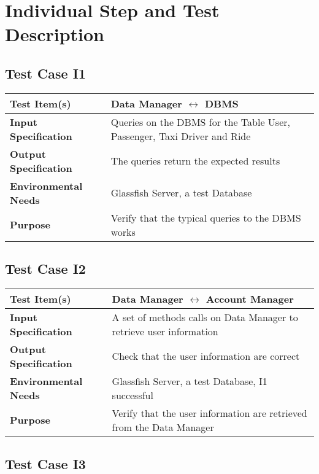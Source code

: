 \section{Individual Step and Test Description}
  
   \subsection{Test Case I1}
   
   	\begin{tabular}{p{} p{}}
   		\hline
   		\textbf{Test Item(s)} & Data Manager $ \longleftrightarrow $ DBMS  \\
   		\hline
   		\textbf{Input Specification} & Queries on the DBMS for the Table User, Passenger, Taxi Driver and Ride\\
   		\hline
   		\textbf{Output Specification} & The queries return the expected results\\
   		\hline
   		\textbf{Environmental Needs} &  Glassfish Server, a test Database\\
   		\hline
   		\textbf{Purpose} & Verify that the typical queries to the DBMS works \\
   		\hline
   	\end{tabular}
   
   
    \subsection{Test Case I2}
    
    	\begin{tabular}{p{} p{}}
    		\hline
    		\textbf{Test Item(s)} & Data Manager $ \longleftrightarrow $ Account Manager   \\
    		\hline
    		\textbf{Input Specification} & A set of methods calls on Data Manager to retrieve user information \\
    		\hline
    		\textbf{Output Specification} & Check that the user information are correct \\
    		\hline
    		\textbf{Environmental Needs} &  Glassfish Server, a test Database, I1 successful\\
    		\hline
    		\textbf{Purpose} & Verify that the user information are retrieved from the Data Manager \\
    		\hline
    	\end{tabular}
    
    
    \newpage
     \subsection{Test Case I3}
     
